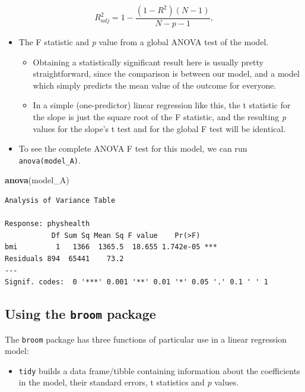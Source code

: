 \documentclass[]{book}
\newenvironment{Shaded}{\begin{snugshade}}{\end{snugshade}}
\newcommand{\KeywordTok}[1]{\textcolor[rgb]{0.13,0.29,0.53}{\textbf{#1}}}
\newcommand{\NormalTok}[1]{#1}
\providecommand{\tightlist}{%
  \setlength{\itemsep}{0pt}\setlength{\parskip}{0pt}}
\theoremstyle{definition}
\theoremstyle{definition}
\theoremstyle{definition}
\theoremstyle{remark}
\begin{document}
\[
R^2_{adj} = 1 - \frac{(1 - R^2)(N - 1)}{N - p - 1},
\]

\begin{itemize}
\tightlist
\item
  The F statistic and \emph{p} value from a global ANOVA test of the
  model.

  \begin{itemize}
  \tightlist
  \item
    Obtaining a statistically significant result here is usually pretty
    straightforward, since the comparison is between our model, and a
    model which simply predicts the mean value of the outcome for
    everyone.
  \item
    In a simple (one-predictor) linear regression like this, the t
    statistic for the slope is just the square root of the F statistic,
    and the resulting \emph{p} values for the slope's t test and for the
    global F test will be identical.
  \end{itemize}
\item
  To see the complete ANOVA F test for this model, we can run
  \texttt{anova(model\_A)}.
\end{itemize}

\begin{Shaded}
\begin{Highlighting}[]
\KeywordTok{anova}\NormalTok{(model_A)}
\end{Highlighting}
\end{Shaded}

\begin{verbatim}
Analysis of Variance Table

Response: physhealth
           Df Sum Sq Mean Sq F value    Pr(>F)    
bmi         1   1366  1365.5  18.655 1.742e-05 ***
Residuals 894  65441    73.2                      
---
Signif. codes:  0 '***' 0.001 '**' 0.01 '*' 0.05 '.' 0.1 ' ' 1
\end{verbatim}

\subsection{\texorpdfstring{Using the \texttt{broom}
package}{Using the broom package}}\label{using-the-broom-package}

The \texttt{broom} package has three functions of particular use in a
linear regression model:

\begin{itemize}
\tightlist
\item
  \texttt{tidy} builds a data frame/tibble containing information about
  the coefficients in the model, their standard errors, t statistics and
  \emph{p} values.
\end{itemize}
\end{document}
